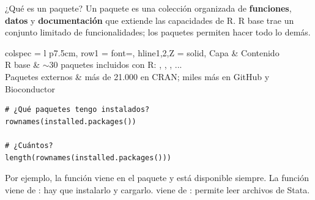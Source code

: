 \documentclass[8pt]{beamer}
\begin{document}
	\subtitle{Cheatsheet de paquetes de R}

	\begin{frame}[plain]
		\maketitle
	\end{frame}


	\begin{frame}[fragile]{¿Qué es un paquete?}
		Un paquete es una colección organizada de \textbf{funciones}, \textbf{datos} y \textbf{documentación} que extiende las capacidades de R. R base trae un conjunto limitado de funcionalidades; los paquetes permiten hacer todo lo demás.

		\begin{center}
			\small
			\begin{tblr}{
				colspec  = {l p{7.5cm}},
				row{1}   = {font=\bfseries},
				hline{1,2,Z} = {solid},
			}
				Capa & Contenido\\
				R base & $\sim$30 paquetes incluidos con R: , , , ...\\
				Paquetes externos & más de 21.000 en CRAN; miles más en GitHub y Bioconductor\\
			\end{tblr}
		\end{center}

\begin{lstlisting}[style=RScript]
# ¿Qué paquetes tengo instalados?
rownames(installed.packages())

# ¿Cuántos?
length(rownames(installed.packages()))
\end{lstlisting}

		\begin{block}{}
			Por ejemplo, la funci\'on  viene en el paquete  y está disponible siempre. La funci\'on  viene de : hay que instalarlo y cargarlo.  viene de : permite leer archivos de Stata.
		\end{block}
	\end{frame}
\end{document}
